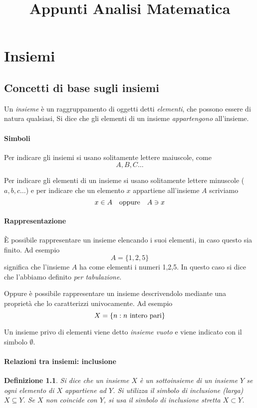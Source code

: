 \documentclass[11pt]{book}
\title{Appunti Analisi Matematica}
\newtheorem*{definition}{Definizione}
\begin{document}
\tableofcontents
\newpage
{}
\chapter{Insiemi}
\section{Concetti di base sugli insiemi}
Un \textit{insieme} è un raggruppamento di oggetti detti \textit{elementi}, che possono essere di natura qualsiasi, Si 
dice che gli elementi di un insieme \textit{appartengono} all'insieme.
\subsubsection{Simboli}
Per indicare gli insiemi si usano solitamente lettere maiuscole, come
\begin{equation*}
    A,B,C\dots
\end{equation*}

Per indicare gli elementi di un insieme si usano solitamente lettere minuscole ($a,b,c\dots$) e per indicare che un elemento 
$x$ appartiene all'insieme $A$ scriviamo
\begin{equation*}
    x\in A \quad \textnormal{oppure} \quad A\ni x
\end{equation*}
\subsubsection{Rappresentazione}
È possibile rappresentare un insieme elencando i suoi elementi, in caso questo sia finito. Ad esempio
\begin{equation*}
    A=\{1,2,5\}
\end{equation*}
significa che l'insieme $A$ ha come elementi i numeri 1,2,5. In questo caso si dice che l'abbiamo definito \textit{per tabulazione}.

Oppure è possibile rappresentare un insieme descrivendolo mediante una proprietà che lo caratterizzi univocamente. Ad esempio
\begin{equation*}
    X=\{n:n \textnormal{ intero pari}\}
\end{equation*}

Un insieme privo di elementi viene detto \textit{insieme vuoto} e viene indicato con il simbolo $\emptyset$.
\subsubsection{Relazioni tra insiemi: inclusione}
\begin{definition}
    Si dice che un insieme $X$ è un sottoinsieme di un insieme $Y$ se ogni elemento di $X$ appartiene ad $Y$. Si utilizza 
    il simbolo di inclusione (larga) $X\subseteq Y$. Se $X$ non coincide con $Y$, si usa il simbolo di inclusione stretta
    $X\subset Y$.
\end{definition}
\end{document}
